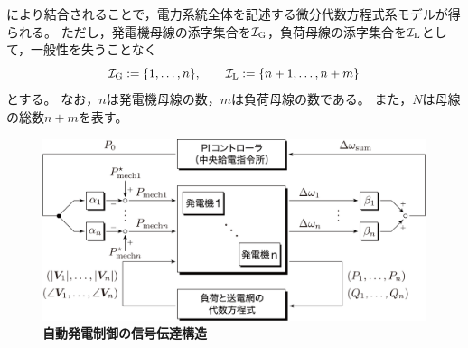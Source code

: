 \documentclass[tombow,dvipdfmx]{corona-a5-1.1}
\begin{document}
により結合されることで，電力系統全体を記述する微分代数方程式系モデルが得られる。
ただし，発電機母線の添字集合を$\mathcal{I}_{\rm G}$，負荷母線の添字集合を$\mathcal{I}_{\rm L}$として，一般性を失うことなく
\[
\mathcal{I}_{\rm G} :=  \{1,\ldots, n\}
,\qquad
\mathcal{I}_{\rm L} := \{n+1,\ldots, n+m\}
\]
とする。
なお，$n$は発電機母線の数，$m$は負荷母線の数である。
また，$N$は母線の総数$n+m$を表す。


\begin{figure}[t]
\centering
\includegraphics[width = .99\linewidth]{figs/bcAGC}
\medskip
\caption{\textbf{自動発電制御の信号伝達構造}}
\label{fig:bcAGC}
\medskip
\end{figure}
\end{document}
